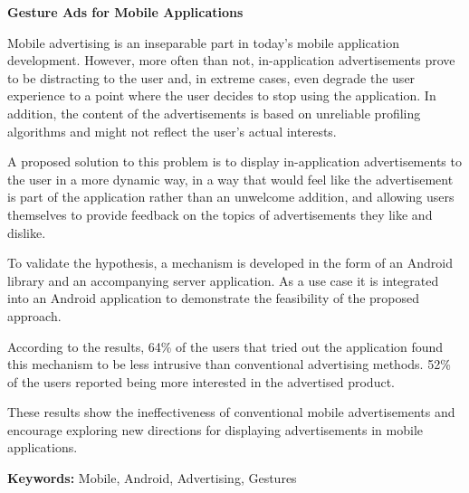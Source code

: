 \begin{abstracts}

\textbf{Gesture Ads for Mobile Applications}

Mobile advertising is an inseparable part in today's mobile application development. However, more often than not, in-application advertisements prove to be distracting to the user and, in extreme cases, even degrade the user experience to a point where the user decides to stop using the application. In addition, the content of the advertisements is based on unreliable profiling algorithms and might not reflect the user's actual interests.

A proposed solution to this problem is to display in-application advertisements to the user in a more dynamic way, in a way that would feel like the advertisement is part of the application rather than an unwelcome addition, and allowing users themselves to provide feedback on the topics of advertisements they like and dislike.

To validate the hypothesis, a mechanism is developed in the form of an Android library and an accompanying server application. As a use case it is integrated into an Android application to demonstrate the feasibility of the proposed approach.

According to the results, 64\% of the users that tried out the application found this mechanism to be less intrusive than conventional advertising methods. 52\% of the users reported being more interested in the advertised product.

These results show the ineffectiveness of conventional mobile advertisements and encourage exploring new directions for displaying advertisements in mobile applications.

\bigskip

\textbf{Keywords:} Mobile, Android, Advertising, Gestures

\end{abstracts}